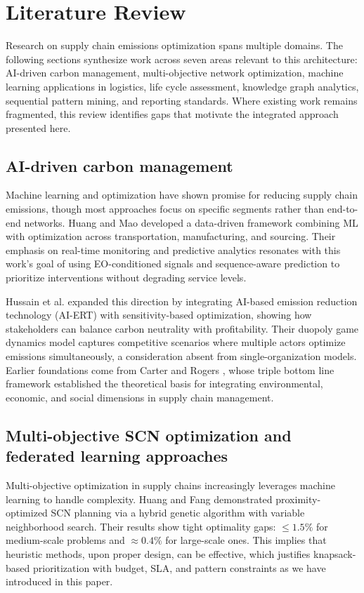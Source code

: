 \documentclass[conference]{IEEEtran}
\begin{document}
\section{Literature Review}\label{sec:lit}
Research on supply chain emissions optimization spans multiple domains. The following sections synthesize work across seven areas relevant to this architecture: AI-driven carbon management, multi-objective network optimization, machine learning applications in logistics, life cycle assessment, knowledge graph analytics, sequential pattern mining, and reporting standards. Where existing work remains fragmented, this review identifies gaps that motivate the integrated approach presented here.

\subsection{AI-driven carbon management}
Machine learning and optimization have shown promise for reducing supply chain emissions, though most approaches focus on specific segments rather than end-to-end networks. Huang and Mao \cite{huang2024carbon} developed a data-driven framework combining ML with optimization across transportation, manufacturing, and sourcing. Their emphasis on real-time monitoring and predictive analytics resonates with this work's goal of using EO-conditioned signals and sequence-aware prediction to prioritize interventions without degrading service levels.

Hussain et al. \cite{hussain2025optimizing} expanded this direction by integrating AI-based emission reduction technology (AI-ERT) with sensitivity-based optimization, showing how stakeholders can balance carbon neutrality with profitability. Their duopoly game dynamics model captures competitive scenarios where multiple actors optimize emissions simultaneously, a consideration absent from single-organization models. Earlier foundations come from Carter and Rogers \cite{carter2008framework}, whose triple bottom line framework established the theoretical basis for integrating environmental, economic, and social dimensions in supply chain management.

\subsection{Multi-objective SCN optimization and federated learning approaches}
Multi-objective optimization in supply chains increasingly leverages machine learning to handle complexity. Huang and Fang \cite{fang2024multiobjective} demonstrated proximity-optimized SCN planning via a hybrid genetic algorithm with variable neighborhood search. Their results show tight optimality gaps: \(\leq 1.5\%\) for medium-scale problems and \(\approx 0.4\%\) for large-scale ones. This implies that heuristic methods, upon proper design, can be effective, which justifies knapsack-based prioritization with budget, SLA, and pattern constraints as we have introduced in this paper.
\end{document}
